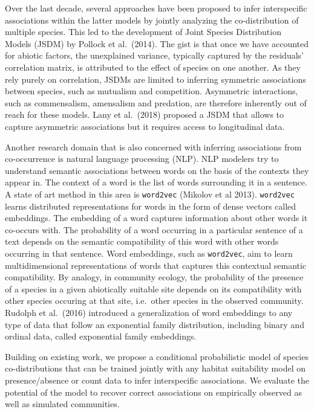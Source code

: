 \documentclass[10pt,a4paper]{article}
\begin{document}
Over the last decade, several approaches have been proposed to infer
interspecific associations within the latter models by jointly
analyzing the co-distribution of multiple species. This led to the
development of Joint Species Distribution Models (JSDM) by Pollock et
al.\ (2014). The gist is that once we have accounted for abiotic
factors, the unexplained variance, typically captured by the residuals'
correlation matrix, is attributed to the effect of
species on one another. As they rely purely on correlation, JSDMs are
limited to inferring symmetric associations between species, such as
mutualism and competition. Asymmetric interactions, such as
commensalism, amensalism and predation, are therefore inherently out
of reach for these models. Lany et al.\ (2018) proposed a JSDM that
allows to capture asymmetric associations but it requires access to
longitudinal data.

\medskip Another research domain that is also concerned with inferring
associations from co-occurrence is natural language processing
(NLP). NLP modelers try to understand semantic associations between
words on the basis of the contexts they appear in. The context of a
word is the list of words surrounding it in a sentence. A state of art
method in this area is \texttt{word2vec} (Mikolov et al
2013). \texttt{word2vec} learns distributed representations for words
in the form of dense vectors called embeddings. The embedding of a
word captures information about other words it co-occurs with. The
probability of a word occurring in a particular sentence of a text
depends on the semantic compatibility of this word with other words
occurring in that sentence. Word embeddings, such as
\texttt{word2vec}, aim to learn multidimensional representations of
words that captures this contextual semantic compatibility. By
analogy, in community ecology, the probability of the presence of a
species in a given abiotically suitable site depends on its
compatibility with other species occuring at that site, i.e.\ other
species in the observed community.
Rudolph et al.\ (2016) introduced a generalization of word embeddings to
any type of data that follow an exponential family distribution,
including binary and ordinal data, called exponential family
embeddings.

Building on existing work, we propose a conditional
probabilistic model of species co-distributions that can be trained
jointly with any habitat suitability model on presence/absence or
count data to infer interspecific associations. We evaluate the
potential of the model to recover correct associations on empirically
observed as well as simulated communities.
\end{document}
